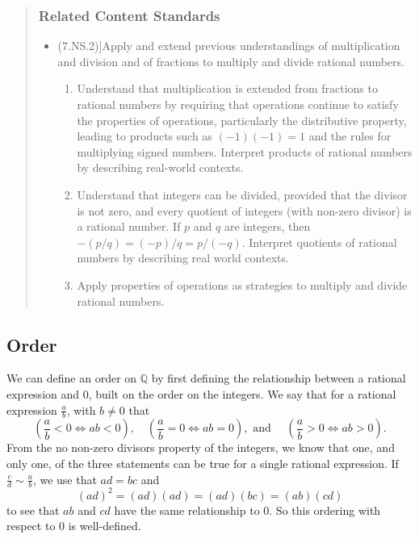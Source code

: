 \documentclass[
]{book}
\providecommand{\tightlist}{%
  \setlength{\itemsep}{0pt}\setlength{\parskip}{0pt}}
\theoremstyle{definition}
\theoremstyle{definition}
\theoremstyle{definition}
\theoremstyle{remark}
\begin{document}
\begin{quote}
\hypertarget{related-content-standards-8}{%
\subsubsection*{Related Content Standards}\label{related-content-standards-8}}

\begin{itemize}
\tightlist
\item
  (7.NS.2){]}Apply and extend previous understandings of multiplication and division and of fractions to multiply and divide rational numbers.

  \begin{enumerate}
  \def\labelenumi{\alph{enumi}.}
  \tightlist
  \item
    Understand that multiplication is extended from fractions to rational numbers by requiring that operations continue to satisfy the properties of operations, particularly the distributive property, leading to products such as \((-1)(-1) = 1\) and the rules for multiplying signed numbers. Interpret products of rational numbers by describing real-world contexts.
  \item
    Understand that integers can be divided, provided that the divisor is not zero, and every quotient of integers (with non-zero divisor) is a rational number. If \(p\) and \(q\) are integers, then \(-(p/q) = (-p)/q = p/(-q)\). Interpret quotients of rational numbers by describing real world contexts.
  \item
    Apply properties of operations as strategies to multiply and divide rational numbers.
  \end{enumerate}
\end{itemize}
\end{quote}

\hypertarget{order}{%
\subsection{Order}\label{order}}

We can define an order on \(\mathbb{Q}\) by first defining the relationship between a rational expression and \(0\), built on the order on the integers. We say that for a rational expression \(\frac{a}{b}\), with \(b\neq 0\) that
\[ \left(\frac{a}{b} < 0 \Leftrightarrow ab<0\right),  \quad \left(\frac{a}{b}=0 \Leftrightarrow ab=0\right), \mbox{ and } \quad \left(\frac{a}{b} >0 \Leftrightarrow ab >0\right).\]
From the no non-zero divisors property of the integers, we know that one, and only one, of the three statements can be true for a single rational expression. If \(\frac{c}{d}\sim \frac{a}{b}\), we use that \(ad=bc\) and \[(ad)^2 = (ad)(ad) = (ad)(bc) = (ab)(cd)\] to see that \(ab\) and \(cd\) have the same relationship to \(0\). So this ordering with respect to \(0\) is well-defined.
\end{document}
